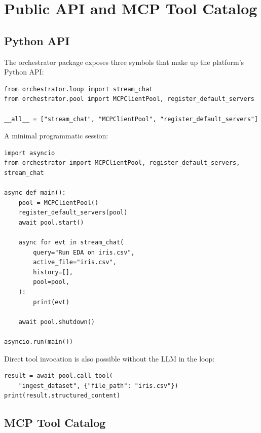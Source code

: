 \chapter{Public API and MCP Tool Catalog}
\label{app:api}

\section{Python API}
\label{sec:api}

The orchestrator package exposes three symbols that make up the
platform's Python API:

\begin{lstlisting}[caption={\file{orchestrator/\_\_init\_\_.py}.},
label={lst:api}]
from orchestrator.loop import stream_chat
from orchestrator.pool import MCPClientPool, register_default_servers

__all__ = ["stream_chat", "MCPClientPool", "register_default_servers"]
\end{lstlisting}

A minimal programmatic session:

\begin{lstlisting}[caption={Minimal script using the Python API.},
label={lst:api-usage}]
import asyncio
from orchestrator import MCPClientPool, register_default_servers, stream_chat

async def main():
    pool = MCPClientPool()
    register_default_servers(pool)
    await pool.start()

    async for evt in stream_chat(
        query="Run EDA on iris.csv",
        active_file="iris.csv",
        history=[],
        pool=pool,
    ):
        print(evt)

    await pool.shutdown()

asyncio.run(main())
\end{lstlisting}

Direct tool invocation is also possible without the LLM in the
loop:

\begin{lstlisting}[caption={Direct MCP tool call (bypasses the LLM).},
label={lst:direct}]
result = await pool.call_tool(
    "ingest_dataset", {"file_path": "iris.csv"})
print(result.structured_content)
\end{lstlisting}

\section{MCP Tool Catalog}
\label{sec:tool-catalog}

